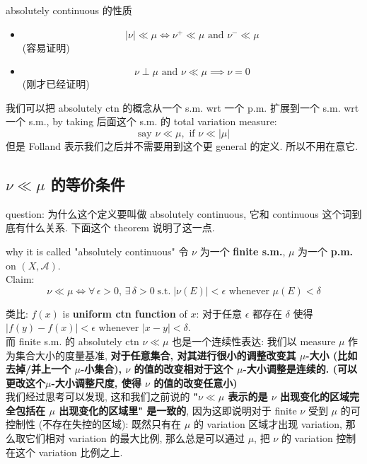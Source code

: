 \documentclass[lang=cn,11pt]{elegantbook}
\begin{document}
\begin{proposition}{absolutely continuous 的性质}
\begin{itemize}
    \item \[ |\nu | \ll \mu \iff  \nu ^+ \ll \mu \text{ and } \nu^- \ll \mu  \](容易证明)
    \item \[  \nu \perp \mu \text{ and } \nu \ll \mu \implies \nu = 0  \](刚才已经证明)
\end{itemize}    
\end{proposition}
我们可以把 absolutely ctn 的概念从一个 s.m. wrt 一个 p.m. 扩展到一个 s.m. wrt 一个 s.m., by taking 后面这个 s.m. 的 total variation measure: \[
\text{say } \nu \ll \mu, \text{ if }  \nu \ll |\mu|
\]
但是 Folland 表示我们之后并不需要用到这个更 general 的定义. 所以不用在意它.

\subsection{$\nu \ll \mu$ 的等价条件}
question: 为什么这个定义要叫做 absolutely continuous, 它和 continuous 这个词到底有什么关系. 下面这个 theorem 说明了这一点.
\begin{theorem}{why it is called "absolutely continuous"}
    令 $\nu$ 为一个 \textbf{finite s.m.}, $\mu$ 为一个 \textbf{p.m.} on $(X,\mathcal{A})$.\\
    Claim: \[\nu \ll \mu \iff \forall \, \epsilon>0,\, \exists  \, \delta > 0 \;\text{s.t.}  \;|\nu(E)| <\epsilon  \text{ whenever } \mu(E)< \delta  \]
\end{theorem}
\begin{remark}
类比: $f(x)$ is \textbf{uniform ctn function} of $x$: 对于任意 $\epsilon$ 都存在 $\delta$ 使得 $|f(y) - f(x)| < \epsilon$ whenever $|x-y| < \delta$.\\
而 finite s.m. 的 absolutely ctn  $\nu \ll \mu$ 也是一个连续性表达: 我们以 measure $\mu$ 作为集合大小的度量基准, \textbf{对于任意集合, 对其进行很小的调整改变其 $\mu$-大小 (比如去掉/并上一个 $\mu$-小集合), $\nu$ 的值的改变相对于这个 $\mu$-大小调整是连续的. (可以更改这个$\mu$-大小调整尺度, 使得 $\nu$ 的值的改变任意小)}\\
我们经过思考可以发现, 这和我们之前说的 \textbf{"$\nu \ll \mu$ 表示的是 $\nu$ 出现变化的区域完全包括在 $\mu$ 出现变化的区域里" 是一致的}, 因为这即说明对于 finite $\nu$ 受到 $\mu$ 的可控制性 (不存在失控的区域): 既然只有在 $\mu$ 的 variation 区域才出现 variation, 那么取它们相对 variation 的最大比例, 那么总是可以通过 $\mu$, 把 $\nu$ 的 variation 控制在这个 variation 比例之上.
\end{remark} 
\end{document}
